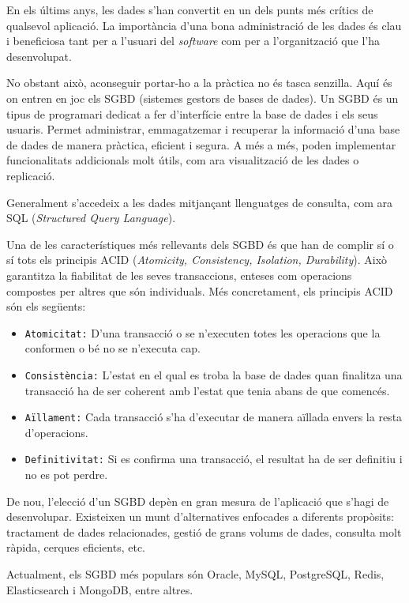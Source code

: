 \documentclass[a4paper,12pt]{ThesisStyle}
\begin{document}
En els últims anys, les dades s'han convertit en un dels punts més crítics de qualsevol aplicació. La importància d'una bona administració de les dades és clau i beneficiosa tant per a l'usuari del \textit{software} com per a l'organització que l'ha desenvolupat.

No obstant això, aconseguir portar-ho a la pràctica no és tasca senzilla. Aquí és on entren en joc els SGBD (sistemes gestors de bases de dades). Un SGBD és un tipus de programari dedicat a fer d'interfície entre la base de dades i els seus usuaris. Permet administrar, emmagatzemar i recuperar la informació d'una base de dades de manera pràctica, eficient i segura. A més a més, poden implementar funcionalitats addicionals molt útils, com ara visualització de les dades o replicació.

Generalment s'accedeix a les dades mitjançant llenguatges de consulta, com ara SQL (\textit{Structured Query Language}).

Una de les característiques més rellevants dels SGBD és que han de complir sí o sí tots els principis ACID (\textit{Atomicity, Consistency, Isolation, Durability}). Això garantitza la fiabilitat de les seves transaccions, enteses com operacions compostes per altres que són individuals. Més concretament, els principis ACID són els següents:
\begin{itemize}
  \item \texttt{Atomicitat:} D'una transacció o se n'executen totes les operacions que la conformen o bé no se n'executa cap.
  \item \texttt{Consistència:} L'estat en el qual es troba la base de dades quan finalitza una transacció ha de ser coherent amb l'estat que tenia abans de que comencés.
  \item \texttt{Aïllament:} Cada transacció s'ha d'executar de manera aïllada envers la resta d'operacions.
  \item \texttt{Definitivitat:} Si es confirma una transacció, el resultat ha de ser definitiu i no es pot perdre.
\end{itemize}

De nou, l'elecció d'un SGBD depèn en gran mesura de l'aplicació que s'hagi de desenvolupar. Existeixen un munt d'alternatives enfocades a diferents propòsits: tractament de dades relacionades, gestió de grans volums de dades, consulta molt ràpida, cerques eficients, etc.

Actualment, els SGBD més populars són Oracle, MySQL, PostgreSQL, Redis, Elasticsearch i MongoDB, entre altres.
\end{document}
